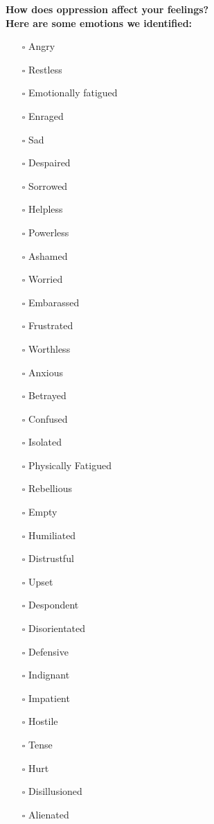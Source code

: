 \noindent\textcolor{ProcessBlue}{\textbf{\Large{How does oppression affect your feelings?}}}\\
\large{\textbf{Here are some emotions we identified:}}
\begin{multicols}{3}
\begin{itemize}
\item[$\square$]{Angry}
\item[$\square$]{Restless}
\item[$\square$]{Emotionally fatigued}
\item[$\square$]{Enraged}
\item[$\square$]{Sad}
\item[$\square$]{Despaired}
\item[$\square$]{Sorrowed}
\item[$\square$]{Helpless}
\item[$\square$]{Powerless}
\item[$\square$]{Ashamed}
\item[$\square$]{Worried}
\item[$\square$]{Embarassed}
\item[$\square$]{Frustrated}
\item[$\square$]{Worthless}
\item[$\square$]{Anxious}
\item[$\square$]{Betrayed}
\item[$\square$]{Confused}
\item[$\square$]{Isolated}
\item[$\square$]{Physically Fatigued}
\item[$\square$]{Rebellious}
\item[$\square$]{Empty}
\item[$\square$]{Humiliated}
\item[$\square$]{Distrustful}
\item[$\square$]{Upset}
\item[$\square$]{Despondent}
\item[$\square$]{Disorientated}
\item[$\square$]{Defensive}
\item[$\square$]{Indignant}
\item[$\square$]{Impatient}
\item[$\square$]{Hostile}
\item[$\square$]{Tense}
\item[$\square$]{Hurt}
\item[$\square$]{Disillusioned}
\item[$\square$]{Alienated}
\end{itemize}
\end{multicols}


